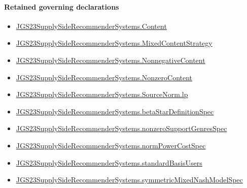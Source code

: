 \documentclass[10pt]{article}
\begin{document}
\paragraph{Retained governing declarations}
\begin{itemize}\raggedright
\item \hyperlink{governing-declaration-367305fda50f0ada}{JGS23\allowbreak{}Supply\allowbreak{}Side\allowbreak{}Recommender\allowbreak{}Systems.\allowbreak{}Content}
\item \hyperlink{governing-declaration-2089965d06cf0282}{JGS23\allowbreak{}Supply\allowbreak{}Side\allowbreak{}Recommender\allowbreak{}Systems.\allowbreak{}Mixed\allowbreak{}Content\allowbreak{}Strategy}
\item \hyperlink{governing-declaration-d426babe40b9593c}{JGS23\allowbreak{}Supply\allowbreak{}Side\allowbreak{}Recommender\allowbreak{}Systems.\allowbreak{}Nonnegative\allowbreak{}Content}
\item \hyperlink{governing-declaration-90e2ac7d13788c50}{JGS23\allowbreak{}Supply\allowbreak{}Side\allowbreak{}Recommender\allowbreak{}Systems.\allowbreak{}Nonzero\allowbreak{}Content}
\item \hyperlink{governing-declaration-f359e4d59fc74c80}{JGS23\allowbreak{}Supply\allowbreak{}Side\allowbreak{}Recommender\allowbreak{}Systems.\allowbreak{}Source\allowbreak{}Norm.\allowbreak{}lp}
\item \hyperlink{paper-prerequisite-27ab0f155f5dcf24}{JGS23\allowbreak{}Supply\allowbreak{}Side\allowbreak{}Recommender\allowbreak{}Systems.\allowbreak{}beta\allowbreak{}Star\allowbreak{}Definition\allowbreak{}Spec}
\item \hyperlink{governing-declaration-588c7a0b2af225d7}{JGS23\allowbreak{}Supply\allowbreak{}Side\allowbreak{}Recommender\allowbreak{}Systems.\allowbreak{}nonzero\allowbreak{}Support\allowbreak{}Genres\allowbreak{}Spec}
\item \hyperlink{governing-declaration-6ba13dc1cae95e6e}{JGS23\allowbreak{}Supply\allowbreak{}Side\allowbreak{}Recommender\allowbreak{}Systems.\allowbreak{}norm\allowbreak{}Power\allowbreak{}Cost\allowbreak{}Spec}
\item \hyperlink{governing-declaration-135fc11c64755ad6}{JGS23\allowbreak{}Supply\allowbreak{}Side\allowbreak{}Recommender\allowbreak{}Systems.\allowbreak{}standard\allowbreak{}Basis\allowbreak{}Users}
\item \hyperlink{paper-prerequisite-b412efba7deb757f}{JGS23\allowbreak{}Supply\allowbreak{}Side\allowbreak{}Recommender\allowbreak{}Systems.\allowbreak{}symmetric\allowbreak{}Mixed\allowbreak{}Nash\allowbreak{}Model\allowbreak{}Spec}
\end{itemize}
\end{document}
